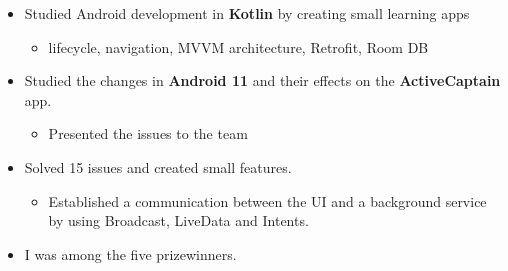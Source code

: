 \begin{itemize}

\item Studied Android development in \textbf{Kotlin} by creating small learning apps

\begin{itemize}
 \item lifecycle, navigation, MVVM architecture, Retrofit, Room DB
\end{itemize}

\item Studied the changes in \textbf{Android 11} and their effects on the \textbf{ActiveCaptain} app. 

\begin{itemize}
 \item Presented the issues to the team
\end{itemize}


\item Solved 15 issues and created small features.

\begin{itemize}
 \item Established a communication between the UI and a background service by using Broadcast, LiveData and Intents.
\end{itemize}

\end{itemize}







\divider


\divider


\begin{itemize}

\item I was among the five prizewinners.

\end{itemize}

